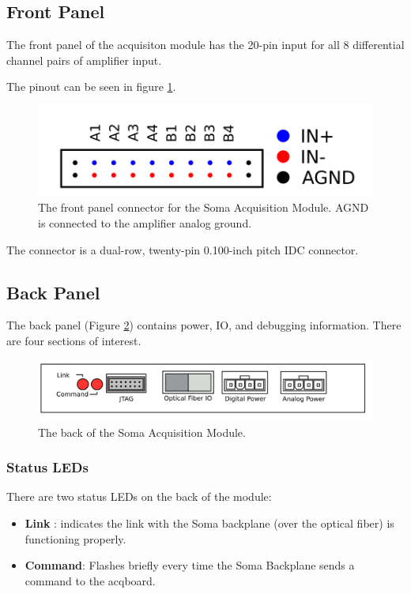 \subsection{Front Panel}

The front panel of the acquisiton module has the 20-pin input for all
8 differential channel pairs of amplifier input.

The pinout can be seen in figure \ref{inputconn}. 


\begin{figure}[h!]
\centering
\includegraphics[scale=1.0]{enclosure.front.inputconn.svg}
\caption{The front panel connector for the Soma Acquisition Module.
  AGND is connected to the amplifier analog ground.  }
\label{inputconn}
\end{figure}

The connector is a dual-row, twenty-pin 0.100-inch pitch IDC
connector.


\subsection{Back Panel}
The back panel (Figure \ref{backpanel}) contains power, IO, and
debugging information. There are four sections of interest.

\begin{figure}[h!]
\centering
\includegraphics[scale=1.0]{enclosure.back.svg}
\caption{The back of the Soma Acquisition Module.}
\label{backpanel}
\end{figure}

\subsubsection{Status LEDs}
There are two status LEDs on the back of the module:
\begin{itemize}
\item \textbf{Link} : indicates the link with the Soma backplane (over the optical fiber)
is functioning properly. 
\item \textbf{Command}: Flashes briefly every time the Soma Backplane sends a command to the 
acqboard. 
\end{itemize}

